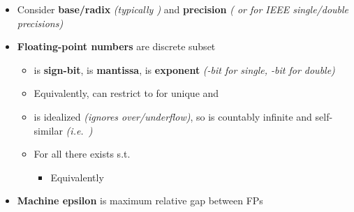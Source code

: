 \begin{itemize}

  \item
        Consider \textbf{base/radix}  \emph{(typically
          )} and \textbf{precision}  \emph{(
          or  for IEEE single/double precisions)}
  \item
        \textbf{Floating-point numbers} are discrete subset

        \begin{itemize}

          \item
                 is \textbf{sign-bit},  is
                \textbf{mantissa},  is \textbf{exponent}
                \emph{(-bit for single, -bit for double)}
          \item
                Equivalently, can restrict to
                 for unique  and
          \item
                 is idealized \emph{(ignores
                  over/underflow)}, so is countably infinite and self-similar
                \emph{(i.e.~)}
          \item
                For all  there exists
                 s.t.

                \begin{itemize}

                  \item
                        Equivalently
                \end{itemize}
        \end{itemize}
  \item
        \textbf{Machine epsilon}
        is maximum relative gap between FPs

        \begin{itemize}


\end{itemize}
\end{itemize}

